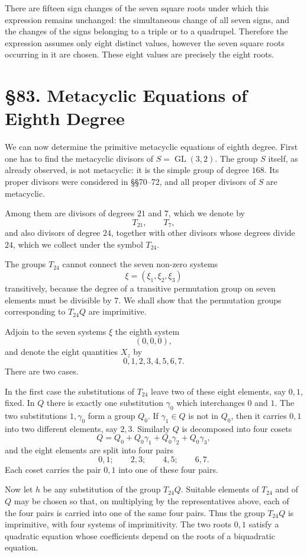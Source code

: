 \documentclass[11pt,a4paper]{book}
\newcommand{\webersection}[2]{\clearpage\section*{\S #1. #2}}
\DeclareMathOperator{\GL}{GL}
\begin{document}
There are fifteen sign changes of the seven square roots under which this expression remains unchanged: the simultaneous change of all seven signs, and the changes of the signs belonging to a triple or to a quadrupel.  Therefore the expression assumes only eight distinct values, however the seven square roots occurring in it are chosen.  These eight values are precisely the eight roots.

\webersection{83}{Metacyclic Equations of Eighth Degree}

We can now determine the primitive metacyclic equations of eighth degree.  First one has to find the metacyclic divisors of \(S=\GL(3,2)\).  The group \(S\) itself, as already observed, is not metacyclic: it is the simple group of degree \(168\).  Its proper divisors were considered in \S\S 70--72, and all proper divisors of \(S\) are metacyclic.

Among them are divisors of degrees \(21\) and \(7\), which we denote by
\[
 T_{21},\qquad T_7,
\]
and also divisors of degree \(24\), together with other divisors whose degrees divide \(24\), which we collect under the symbol \(T_{24}\).

The groups \(T_{24}\) cannot connect the seven non-zero systems
\[
 \xi=(\xi_1,\xi_2,\xi_3)
\]
transitively, because the degree of a transitive permutation group on seven elements must be divisible by \(7\).  We shall show that the permutation groups corresponding to \(T_{24}Q\) are imprimitive.

Adjoin to the seven systems \(\xi\) the eighth system
\[
 (0,0,0),
\]
and denote the eight quantities \(X_z\) by
\[
 0,1,2,3,4,5,6,7.
\]
There are two cases.

In the first case the substitutions of \(T_{24}\) leave two of these eight elements, say \(0,1\), fixed.  In \(Q\) there is exactly one substitution \(\gamma_0\) which interchanges \(0\) and \(1\).  The two substitutions \(1,\gamma_0\) form a group \(Q_0\).  If \(\gamma_1\in Q\) is not in \(Q_0\), then it carries \(0,1\) into two different elements, say \(2,3\).  Similarly \(Q\) is decomposed into four cosets
\[
 Q=Q_0+Q_0\gamma_1+Q_0\gamma_2+Q_0\gamma_3,
\]
and the eight elements are split into four pairs
\[
 0,1;\qquad 2,3;\qquad 4,5;\qquad 6,7 .
\]
Each coset carries the pair \(0,1\) into one of these four pairs.

Now let \(h\) be any substitution of the group \(T_{24}Q\).  Suitable elements of \(T_{24}\) and of \(Q\) may be chosen so that, on multiplying by the representatives above, each of the four pairs is carried into one of the same four pairs.  Thus the group \(T_{24}Q\) is imprimitive, with four systems of imprimitivity.  The two roots \(0,1\) satisfy a quadratic equation whose coefficients depend on the roots of a biquadratic equation.
\end{document}
